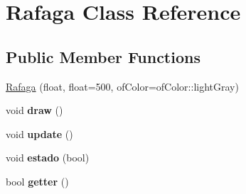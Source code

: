 \hypertarget{class_rafaga}{}\section{Rafaga Class Reference}
\label{class_rafaga}
\subsection*{Public Member Functions}
\begin{DoxyCompactItemize}
\item 
\hyperlink{class_rafaga_a9e01a40ca76ac95f9e3aec362b0cbbc0}{Rafaga} (float, float=500, of\+Color=of\+Color\+::light\+Gray)
\item 
\hypertarget{class_rafaga_a312a7d003583244f5da8cb6b2a49ff21}{}void {\bfseries draw} ()\label{class_rafaga_a312a7d003583244f5da8cb6b2a49ff21}

\item 
\hypertarget{class_rafaga_a6e97b28e4cbd2d31fe54ed6db2facf2a}{}void {\bfseries update} ()\label{class_rafaga_a6e97b28e4cbd2d31fe54ed6db2facf2a}

\item 
\hypertarget{class_rafaga_a54e4d7f24a8a35dc0d8fe23c33f5cf1f}{}void {\bfseries estado} (bool)\label{class_rafaga_a54e4d7f24a8a35dc0d8fe23c33f5cf1f}

\item 
\hypertarget{class_rafaga_a43adf6476f37cabffcc71f5a5234cf4b}{}bool {\bfseries getter} ()\label{class_rafaga_a43adf6476f37cabffcc71f5a5234cf4b}

\end{DoxyCompactItemize}
